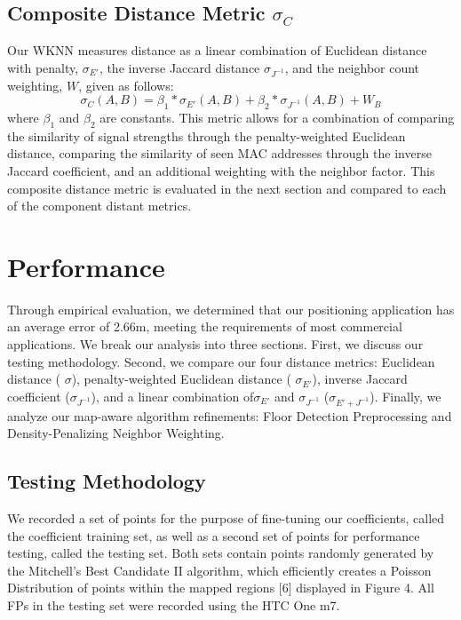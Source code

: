 \documentclass[conference]{IEEEtran}
\begin{document}
\subsection{Composite Distance Metric $\sigma_C$}
\indent Our WKNN measures distance as a linear combination of Euclidean distance with penalty, $\sigma_{E'}$,  the inverse Jaccard distance $\sigma_{J^{-1}}$, and the neighbor count weighting, $W$,  given as follows:
\begin{equation}
\label{composite}
\sigma_C(A, B)=\beta_1*\sigma_{E'}(A, B)+\beta_2*\sigma_{J^{-1}}(A, B)+W_B
\end{equation}
where $\beta_1$ and $\beta_2$ are constants. This metric allows for a combination of comparing the similarity of signal strengths through the penalty-weighted Euclidean distance, comparing the similarity of seen MAC addresses through the inverse Jaccard coefficient, and an additional weighting with the neighbor factor. This composite distance metric is evaluated in the next section and compared to each of the component distant metrics.

\section{Performance}

Through empirical evaluation, we determined that our positioning application has an average error of 2.66m, meeting the requirements of most commercial applications. We break our analysis into three sections. First, we discuss our testing methodology. Second, we compare our four distance metrics: Euclidean distance ( $\sigma$), penalty-weighted Euclidean distance ( $\sigma_{E'}$), inverse Jaccard coefficient ($\sigma_{J^{-1}}$), and a linear combination of$\sigma_{E'}$ and $\sigma_{J^{-1}}$ ($\sigma_{E' + J^{-1}}$). Finally, we analyze our map-aware algorithm refinements: Floor Detection Preprocessing and Density-Penalizing Neighbor Weighting.

\subsection{Testing Methodology}
We recorded a set of points for the purpose of fine-tuning our coefficients, called the coefficient training set, as well as a second set of points for performance testing, called the testing set. Both sets contain points randomly generated by the Mitchell's Best Candidate II algorithm, which efficiently creates a Poisson Distribution of points within the mapped regions [6] displayed in Figure 4. All FPs in the testing set were recorded using the HTC One m7. 
\end{document}
